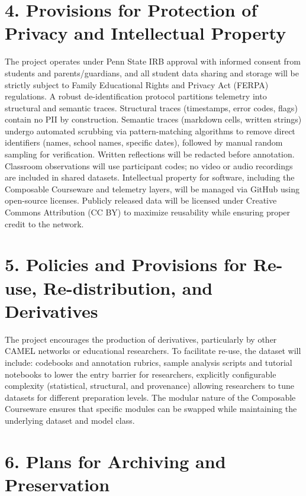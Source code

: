\documentclass[11pt]{article}
\begin{document}
\section*{4. Provisions for Protection of Privacy and Intellectual Property}

The project operates under Penn State IRB approval with informed consent from students and parents/guardians, and all student data sharing and storage will be strictly subject to Family Educational Rights and Privacy Act (FERPA) regulations.
A robust de-identification protocol partitions telemetry into structural and semantic traces. Structural traces (timestamps, error codes, flags) contain no PII by construction.
Semantic traces (markdown cells, written strings) undergo automated scrubbing via pattern-matching algorithms to remove direct identifiers (names, school names, specific dates), followed by manual random sampling for verification.
Written reflections will be redacted before annotation.
Classroom observations will use participant codes; no video or audio recordings are included in shared datasets. 
Intellectual property for software, including the Composable Courseware and telemetry layers, will be managed via GitHub using open-source licenses.
Publicly released data will be licensed under Creative Commons Attribution (CC BY) to maximize reusability while ensuring proper credit to the network.

\section*{5. Policies and Provisions for Re-use, Re-distribution, and Derivatives}

The project encourages the production of derivatives, particularly by other CAMEL networks or educational researchers. To facilitate re-use, the dataset will include: codebooks and annotation rubrics, sample analysis scripts and tutorial notebooks to lower the entry barrier for researchers, explicitly configurable complexity (statistical, structural, and provenance) allowing researchers to tune datasets for different preparation levels.
The modular nature of the Composable Courseware ensures that specific modules can be swapped while maintaining the underlying dataset and model class.

\section*{6. Plans for Archiving and Preservation}
\end{document}

